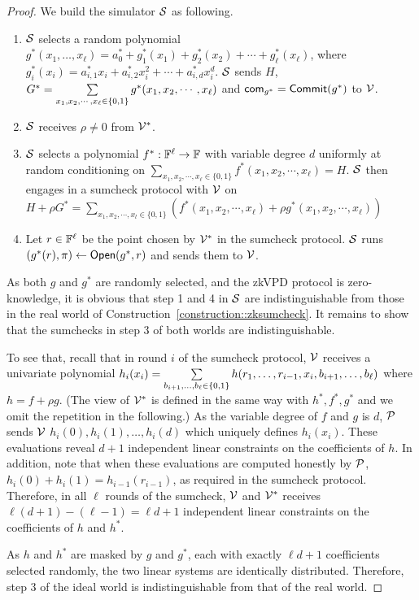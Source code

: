 \begin{proof}
	
	We build the simulator $\S$ as following.
	
	\begin{enumerate}
		
		\item $\S$ selects a random polynomial $g^*(x_1,\ldots,x_\ell) = a^*_{0} + g^*_1(x_1) + g^*_2(x_2) + \cdots + g^*_\ell(x_\ell)$, where $g^*_i(x_i) = a^*_{i,1}x_i + a^*_{i,2}x_i^2 + \cdots + a^*_{i,d}x_i^d$. $\S$ sends $H$, $G^* = \sum\limits_{x_1, x_2, \cdots, x_\ell \in \binary} g^*(x_1, x_2, \cdots, x_\ell)$ and $\comm_{g^*} = \Commit(g^*)$ to $\V$.
		
			
		\item $\S$ receives $\rho \neq 0$ from $\V^*$.
		\item $\S$ selects a polynomial $f^*:\F^\ell\rightarrow\F$ with variable degree $d$ uniformly at random conditioning on $\sum\limits_{x_1, x_2, \cdots, x_\ell \in \{0, 1\}}f^*(x_1, x_2, \cdots, x_\ell) = H$. $\S$ then engages in a sumcheck protocol with $\V$ on  $H+\rho G^* = \sum\limits_{x_1, x_2, \cdots, x_l \in \{0, 1\}}(f^*(x_1, x_2, \cdots, x_\ell)+\rho g^*(x_1, x_2, \cdots, x_\ell))$
		
		\item Let $r \in \F^\ell$ be the point chosen by $\V^*$ in the sumcheck protocol. $\S$ runs $(g^*(r), \pi)\leftarrow\Open(g^*,r)$ and sends them to $\V$.
		
	\end{enumerate} 
	
	As both $g$ and $g^*$ are randomly selected, and the zkVPD protocol is zero-knowledge, it is obvious that step 1 and 4 in $\S$ are indistinguishable from those in the real world of Construction~\ref{construction::zksumcheck}. It remains to show that the sumchecks in step 3 of both worlds are indistinguishable.
	
	To see that, recall that in round $i$ of the sumcheck protocol, $\V$ receives a univariate polynomial $h_i(x_i) = \sum\limits_{b_{i+1}, \ldots,b_\ell\in\binary}h(r_1, \ldots, r_{i-1},x_i, b_{i+1}, \ldots, b_\ell)$ where $h = f+\rho g$. (The view of $\V^*$ is defined in the same way with $h^*,f^*,g^*$ and we omit the repetition in the following.) As the variable degree of $f$ and $g$ is $d$, $\P$ sends $\V$ $h_i(0), h_i(1), \ldots, h_i(d)$ which uniquely defines $h_i(x_i)$. These evaluations reveal $d+1$ independent linear constraints on the coefficients of $h$. In addition, note that when these evaluations are computed honestly by $\P$, $h_i(0)+h_i(1) = h_{i-1}(r_{i-1})$, as required in the sumcheck protocol. Therefore, in all $\ell$ rounds of the sumcheck, $\V$ and $\V^*$ receives $\ell(d+1) - (\ell-1) = \ell d+1$ independent linear constraints on the coefficients of $h$ and $h^*$. 
	
	As $h$ and $h^*$ are masked by $g$ and $g^*$, each with exactly $\ell d+1$ coefficients selected randomly, the two linear systems are identically distributed. Therefore, step 3 of the ideal world is indistinguishable from that of the real world.
	
\end{proof}

